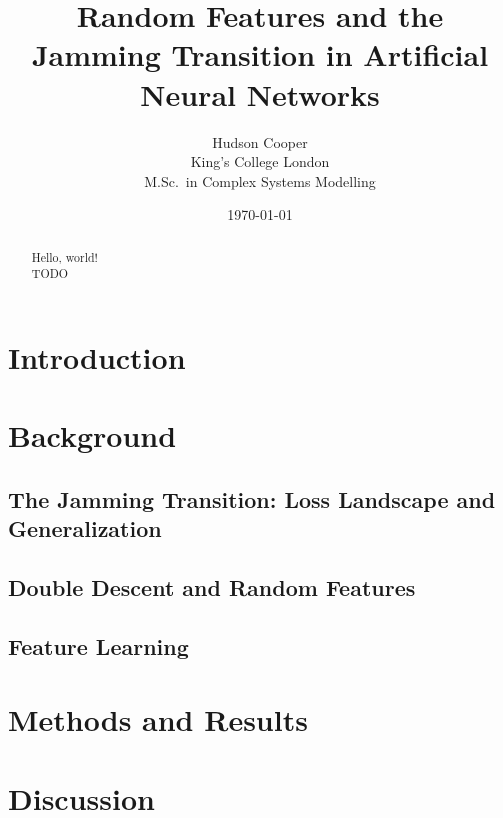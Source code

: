 \documentclass[a4paper, 12pt, titlepage]{article}
\begin{document}
\title{\bf Random Features and the Jamming Transition in Artificial Neural Networks}
\author{
    Hudson Cooper\\
    King's College London\\
    M.Sc.\ in Complex Systems Modelling
}
\date{\today}
\maketitle

\begin{abstract}
    Hello, world!\\
    TODO
\end{abstract}

\section{Introduction}

\section{Background}

\subsection{The Jamming Transition: Loss Landscape and Generalization}
\cite{baity-jesiComparingDynamicsDeep2019}
\subsection{Double Descent and Random Features}
\subsection{Feature Learning}

\section{Methods and Results}

\section{Discussion}

\printbibliography
\end{document}
